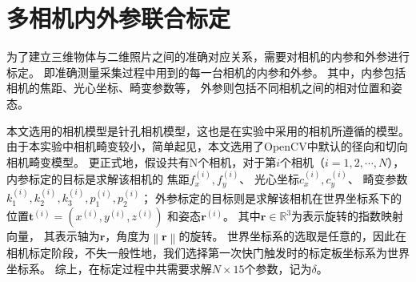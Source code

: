 \section{多相机内外参联合标定}

为了建立三维物体与二维照片之间的准确对应关系，需要对相机的内参和外参进行标定。
即准确测量采集过程中用到的每一台相机的内参和外参。
其中，内参包括相机的焦距、光心坐标、畸变参数等，
外参则包括不同相机之间的相对位置和姿态。

本文选用的相机模型是针孔相机模型，这也是在实验中采用的相机所遵循的模型。
由于本实验中相机畸变较小，简单起见，本文选用了OpenCV中默认的径向和切向相机畸变模型\cite{?}。
更正式地，假设共有N个相机，对于第$i$个相机（$i=1,2,\cdots,N$），
内参标定的目标是求解该相机的
焦距$f_x^{(i)},f_y^{(i)}$、
光心坐标$c_x^{(i)},c_y^{(i)}$、
畸变参数$k_1^{(i)},k_2^{(i)},k_3^{(i)},p_1^{(i)},p_2^{(i)}$；
外参标定的目标则是求解该相机在世界坐标系下的
位置$\mathbf{t}^{(i)}=\left(x^{(i)},y^{(i)},z^{(i)}\right)$
和姿态$\mathbf{r}^{(i)}$。
其中$\mathbf{r}\in \mathbb{R}^3$为表示旋转的指数映射向量\cite{?}，
其表示轴为$\mathbf{r}$，角度为$\left\| \mathbf{r}\right\|$的旋转。
世界坐标系的选取是任意的，因此在相机标定阶段，不失一般性地，我们选择第一次快门触发时的标定板坐标系为世界坐标系。
综上，在标定过程中共需要求解$N\times 15$个参数，记为$\delta$。

